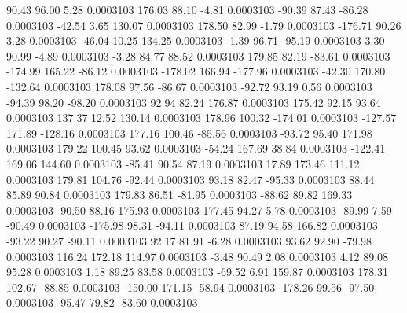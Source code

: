        90.43       96.00        5.28     0.0003103
      176.03       88.10       -4.81     0.0003103
      -90.39       87.43      -86.28     0.0003103
      -42.54        3.65      130.07     0.0003103
      178.50       82.99       -1.79     0.0003103
     -176.71       90.26        3.28     0.0003103
      -46.04       10.25      134.25     0.0003103
       -1.39       96.71      -95.19     0.0003103
        3.30       90.99       -4.89     0.0003103
       -3.28       84.77       88.52     0.0003103
      179.85       82.19      -83.61     0.0003103
     -174.99      165.22      -86.12     0.0003103
     -178.02      166.94     -177.96     0.0003103
      -42.30      170.80     -132.64     0.0003103
      178.08       97.56      -86.67     0.0003103
      -92.72       93.19        0.56     0.0003103
      -94.39       98.20      -98.20     0.0003103
       92.94       82.24      176.87     0.0003103
      175.42       92.15       93.64     0.0003103
      137.37       12.52      130.14     0.0003103
      178.96      100.32     -174.01     0.0003103
     -127.57      171.89     -128.16     0.0003103
      177.16      100.46      -85.56     0.0003103
      -93.72       95.40      171.98     0.0003103
      179.22      100.45       93.62     0.0003103
      -54.24      167.69       38.84     0.0003103
     -122.41      169.06      144.60     0.0003103
      -85.41       90.54       87.19     0.0003103
       17.89      173.46      111.12     0.0003103
      179.81      104.76      -92.44     0.0003103
       93.18       82.47      -95.33     0.0003103
       88.44       85.89       90.84     0.0003103
      179.83       86.51      -81.95     0.0003103
      -88.62       89.82      169.33     0.0003103
      -90.50       88.16      175.93     0.0003103
      177.45       94.27        5.78     0.0003103
      -89.99        7.59      -90.49     0.0003103
     -175.98       98.31      -94.11     0.0003103
       87.19       94.58      166.82     0.0003103
      -93.22       90.27      -90.11     0.0003103
       92.17       81.91       -6.28     0.0003103
       93.62       92.90      -79.98     0.0003103
      116.24      172.18      114.97     0.0003103
       -3.48       90.49        2.08     0.0003103
        4.12       89.08       95.28     0.0003103
        1.18       89.25       83.58     0.0003103
      -69.52        6.91      159.87     0.0003103
      178.31      102.67      -88.85     0.0003103
     -150.00      171.15      -58.94     0.0003103
     -178.26       99.56      -97.50     0.0003103
      -95.47       79.82      -83.60     0.0003103
